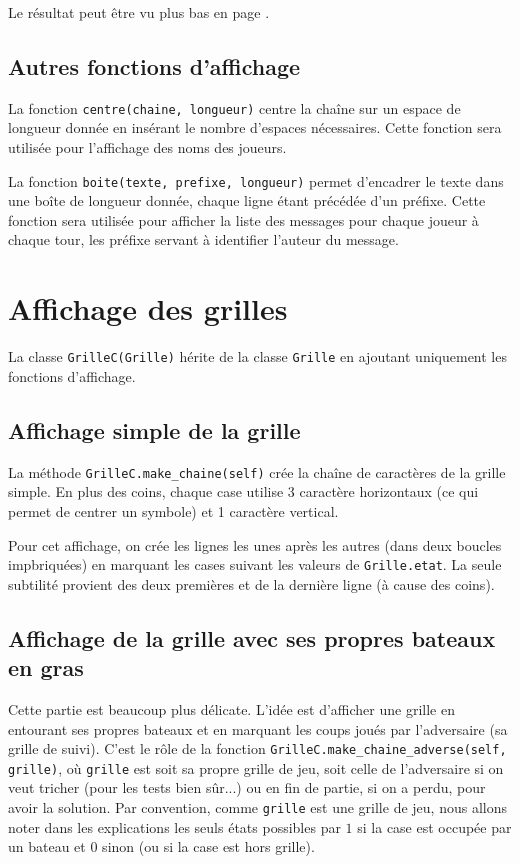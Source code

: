 Le résultat peut être vu plus bas en page \pageref{deux_joueurs}.

\subsection{Autres fonctions d'affichage}
La fonction \texttt{centre(chaine, longueur)} centre la chaîne sur un espace de longueur donnée en insérant le nombre d'espaces nécessaires. Cette fonction sera utilisée pour l'affichage des noms des joueurs.

La fonction \texttt{boite(texte, prefixe, longueur)} permet d'encadrer le texte dans une boîte de longueur donnée, chaque ligne étant précédée d'un préfixe. Cette fonction sera utilisée pour afficher la liste des messages pour chaque joueur à chaque tour, les préfixe servant à identifier l'auteur du message.


\section{Affichage des grilles}
La classe \texttt{GrilleC(Grille)} hérite de la classe \texttt{Grille} en ajoutant uniquement les fonctions d'affichage.

\subsection{Affichage simple de la grille}
La méthode \texttt{GrilleC.make\_chaine(self)} crée la chaîne de caractères de la grille simple. En plus des coins, chaque case utilise 3 caractère horizontaux (ce qui permet de centrer un symbole) et 1 caractère vertical.

Pour cet affichage, on crée les lignes les unes après les autres (dans deux boucles impbriquées) en marquant les cases suivant les valeurs de \texttt{Grille.etat}. La seule subtilité provient des deux premières et de la dernière ligne (à cause des coins).


\subsection{Affichage de la grille avec ses propres bateaux en gras}
Cette partie est beaucoup plus délicate. L'idée est d'afficher une grille en entourant ses propres bateaux et en marquant les coups joués par l'adversaire (sa grille de suivi). C'est le rôle de la fonction \texttt{GrilleC.make\_chaine\_adverse(self, grille)}, où \texttt{grille} est soit sa propre grille de jeu, soit celle de l'adversaire si on veut tricher (pour les tests bien sûr...) ou en fin de partie, si on a perdu, pour avoir la solution. Par convention, comme \texttt{grille} est une grille de jeu, nous allons noter dans les explications les seuls états possibles par $1$ si la case est occupée par un bateau et $0$ sinon (ou si la case est hors grille).

